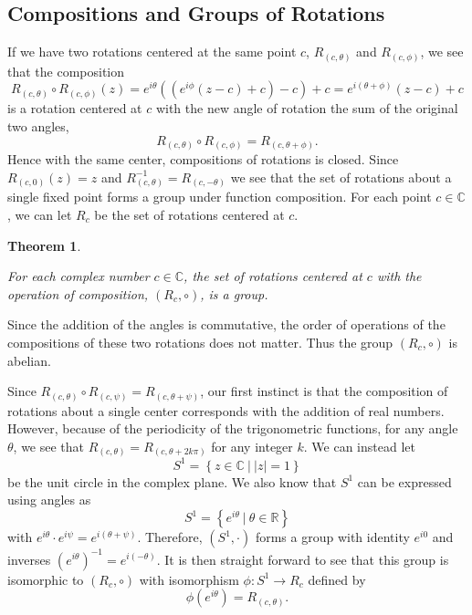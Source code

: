 \documentclass[
]{book}
\newtheorem{theorem}{Theorem}[chapter]
\theoremstyle{definition}
\theoremstyle{definition}
\theoremstyle{definition}
\theoremstyle{definition}
\theoremstyle{remark}
\begin{document}
\hypertarget{compositions-and-groups-of-rotations}{%
\subsection{Compositions and Groups of Rotations}\label{compositions-and-groups-of-rotations}}

If we have two rotations centered at the same point \(c\), \(R_{(c,\theta)}\) and \(R_{(c,\phi)}\), we see that the composition
\[R_{(c,\theta)} \circ R_{(c,\phi)} (z) = e^{i\theta} \left( \left( e^{i \phi} (z-c) + c\right) -c\right) + c = e^{i(\theta+\phi)} (z-c)+c\] is a rotation centered at \(c\) with the new angle of rotation the sum of the original two angles, \[R_{(c,\theta)} \circ R_{(c,\phi)} = R_{(c, \theta+\phi)}.\] Hence with the same center, compositions of rotations is closed. Since \(R_{(c,0)}(z)=z\) and \(R_{(c,\theta)}^{-1} = R_{(c,-\theta)}\) we see that the set of rotations about a single fixed point forms a group under function composition. For each point \(c\in \mathbb{C}\), we can let \(R_c\) be the set of rotations centered at \(c\).

\begin{theorem}
\protect\hypertarget{thm:unlabeled-div-270}{}\label{thm:unlabeled-div-270}

For each complex number \(c\in \mathbb{C}\), the set of rotations centered at \(c\) with the operation of composition, \((R_c,\circ)\), is a group.

\end{theorem}

Since the addition of the angles is commutative, the order of operations of the compositions of these two rotations does not matter. Thus the group \((R_c,\circ)\) is abelian.

Since \(R_{(c,\theta)} \circ R_{(c,\psi)} = R_{(c, \theta+\psi)}\), our first instinct is that the composition of rotations about a single center corresponds with the addition of real numbers. However, because of the periodicity of the trigonometric functions, for any angle \(\theta\), we see that \(R_{(c,\theta)} = R_{(c,\theta+2k\pi)}\) for any integer \(k\). We can instead let \[S^1= \left\{ z\in \mathbb{C} \: \vert \: |z|=1\right\}\] be the unit circle in the complex plane. We also know that \(S^1\) can be expressed using angles as \[S^1=\left\{ e^{i\theta} \: \vert \: \theta\in \mathbb{R}\right\}\] with \(e^{i\theta} \cdot e^{i\psi} = e^{i (\theta+\psi)}\). Therefore, \((S^1,\cdot)\) forms a group with identity \(e^{i0}\) and inverses \(\left(e^{i\theta}\right)^{-1} = e^{i (-\theta)}\). It is then straight forward to see that this group is isomorphic to \((R_c,\circ)\) with isomorphism
\(\phi:S^1\rightarrow R_c\) defined by \[\phi \left(e^{i\theta} \right) = R_{(c,\theta)}.\]
\end{document}
